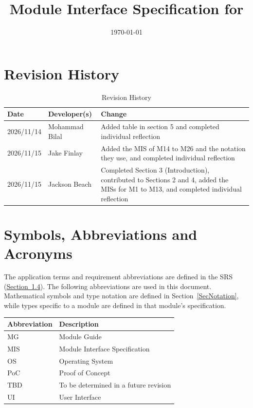 \documentclass[10pt, titlepage]{article}
\newcommand{\srsurl}{https://team-hindsight.github.io/ophthamology-game/SRS/SRS.pdf}
\newcommand{\srsitemref}[2]{\href{\srsurl\#nameddest=#1}{#2}}
\begin{document}
\title{Module Interface Specification for \progname{}}

\author{\authname}

\date{\today}

\maketitle


\section{Revision History}

\begin{table}[!htbp]
\caption{Revision History} \label{TblRevisionHistory}
\begin{tabularx}{\textwidth}{llX}
\toprule
\textbf{Date} & \textbf{Developer(s)} & \textbf{Change}\\
\midrule
2026/11/14 & Mohammad Bilal & Added table in section 5 and completed individual reflection \\
2026/11/15 & Jake Finlay & Added the MIS of M14 to M26 and the notation they use, and completed individual reflection \\
2026/11/15 & Jackson Beach & Completed Section 3 (Introduction), contributed to Sections 2 and 4, added the MISs for M1 to M13, and completed individual reflection \\
\bottomrule
\end{tabularx}
\end{table}

\newpage

\tableofcontents


\newpage

\section{Symbols, Abbreviations and Acronyms}

The application terms and requirement abbreviations are defined in the SRS
(\srsitemref{sec_DefinitionsAndAcronyms}{Section~1.4}). The following
abbreviations are used in this document. Mathematical symbols and type notation
are defined in Section~\ref{SecNotation}, while types specific to a module are
defined in that module's specification.

\begin{center}
\renewcommand{\arraystretch}{1.2}
\begin{tabular}{l p{10cm}}
\toprule
\textbf{Abbreviation} & \textbf{Description}\\
\midrule
MG & Module Guide\\
MIS & Module Interface Specification\\
OS & Operating System\\
PoC & Proof of Concept\\
TBD & To be determined in a future revision\\
UI & User Interface\\
\bottomrule
\end{tabular}
\end{center}
\end{document}
